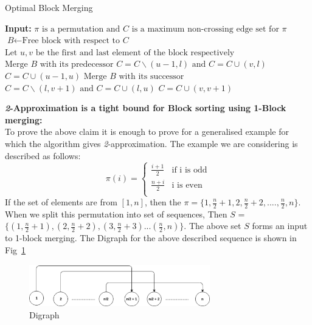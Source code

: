 \documentclass[BTech]{iitmdiss}
\begin{document}
\begin{algorithm}
\caption{Optimal Block Merging}\label{euclid}
\begin{algorithmic}[1]
\State \textbf{Input: } $\pi \text{ is a permutation and }\textit{C} \text{ is a maximum non-crossing edge set for } \pi$ 
\State $\textit{B} \gets \text{Free block with respect to }\textit{C}$ 
\State $\text{Let } u,v \text{ be the first and last element of the block respectively}$
\State $\text{Merge } \textit{B} \text{ with its predecessor}$
\State $C = C\backslash(u-1,l)\text{ and } C = C\cup(v,l)$
\EndIf
\State $C = C\cup(u-1,u)$
\Else
\State $\text{Merge } \textit{B} \text{ with its successor}$
\State $C = C\backslash(l,v+1)\text{ and } C = C\cup(l,u)$
\EndIf
\State $C = C\cup(v,v+1)$
\EndIf
\EndWhile
\EndProcedure
\end{algorithmic}
\end{algorithm}
\noindent
\textbf{\textit{2}-Approximation is a tight bound for Block sorting using 1-Block merging:}\\
To prove the above claim it is enough to prove for a generalised example for which the algorithm gives \textit{2}-approximation. The example we are considering is described as follows:
\[ \pi(i) = \begin{cases} 
      \frac{i+1}{2} & \text{if i is odd} \\
      \frac{n+i}{2} & \text{i is even} \\
   \end{cases}
\]
If the set of elements are from $[1,n]$, then the $\pi = \{1,\frac{n}{2}+1,2,\frac{n}{2}+2,....,\frac{n}{2},n\} $. When we split this permutation into set of sequences, Then $S$ = $\{(1,\frac{n}{2}+1),(2,\frac{n}{2}+2),(3,\frac{n}{2}+3)... (\frac{n}{2},n)\}$. The above set $S$ forms an input to 1-block merging. The Digraph for the above described sequence is shown in Fig~\ref{fig:2approx}
\begin{figure}[htpb]
  \begin{center}
    \includegraphics[width=0.7\textwidth]{2approxtight.eps}
    \caption {Digraph}
  \label{fig:2approx}
  \end{center}
\end{figure}
\end{document}

